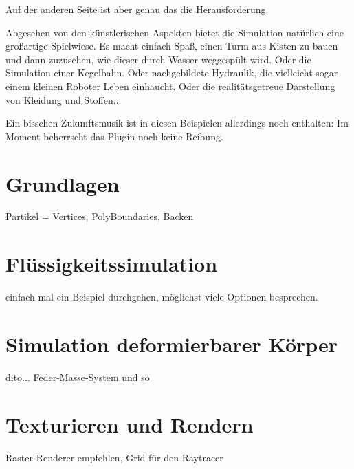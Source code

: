 \documentclass[12pt,a4paper]{scrartcl}
\begin{document}
Auf der anderen Seite ist aber genau das die Herausforderung.

Abgesehen von den künstlerischen Aspekten bietet die Simulation
natürlich eine großartige Spielwiese. Es macht einfach Spaß, einen Turm
aus Kisten zu bauen und dann zuzusehen, wie dieser durch Wasser
weggespült wird. Oder die Simulation einer Kegelbahn. Oder nachgebildete
Hydraulik, die vielleicht sogar einem kleinen Roboter Leben einhaucht.
Oder die realitätsgetreue Darstellung von Kleidung und Stoffen...

Ein bisschen Zukunftsmusik ist in diesen Beispielen allerdings noch
enthalten: Im Moment beherrscht das Plugin noch keine Reibung.

\pagebreak
\section{Grundlagen}
Partikel = Vertices, PolyBoundaries, Backen

\section{Flüssigkeitssimulation}
einfach mal ein Beispiel durchgehen, möglichst viele Optionen
besprechen.

\section{Simulation deformierbarer Körper}
dito... Feder-Masse-System und so

\section{Texturieren und Rendern}
Raster-Renderer empfehlen, Grid für den Raytracer
\end{document}
